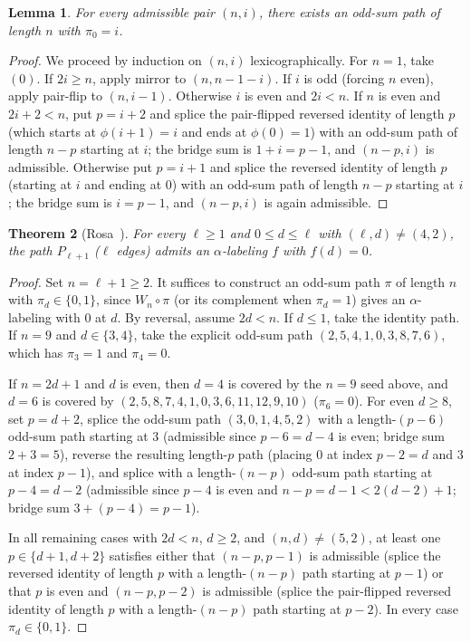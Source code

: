 \documentclass[11pt]{article}
\newtheorem{theorem}{Theorem}[section]
\newtheorem{lemma}[theorem]{Lemma}
\begin{document}
\begin{lemma}\label{lem:block-start}
For every admissible pair $(n, i)$, there exists an odd-sum path of length $n$ with $\pi_0 = i$.
\end{lemma}

\begin{proof}
We proceed by induction on $(n, i)$ lexicographically. For $n = 1$, take $(0)$. If $2i \ge n$, apply mirror to $(n, n - 1 - i)$. If $i$ is odd (forcing $n$ even), apply pair-flip to $(n, i - 1)$. Otherwise $i$ is even and $2i < n$.
If $n$ is even and $2i + 2 < n$, put $p = i + 2$ and splice the pair-flipped reversed identity of length $p$ (which starts at $\phi(i + 1) = i$ and ends at $\phi(0) = 1$) with an odd-sum path of length $n - p$ starting at $i$; the bridge sum is $1 + i = p - 1$, and $(n - p, i)$ is admissible.
Otherwise put $p = i + 1$ and splice the reversed identity of length $p$ (starting at $i$ and ending at $0$) with an odd-sum path of length $n - p$ starting at $i$; the bridge sum is $i = p - 1$, and $(n - p, i)$ is again admissible.
\end{proof}

\begin{theorem}[Rosa~\cite{Rosa1977}]\label{thm:rosa}
For every $\ell \ge 1$ and $0 \le d \le \ell$ with $(\ell, d) \ne (4, 2)$, the path $P_{\ell+1}$ ($\ell$ edges) admits an $\alpha$-labeling $f$ with $f(d) = 0$.
\end{theorem}

\begin{proof}
Set $n = \ell + 1 \ge 2$. It suffices to construct an odd-sum path $\pi$ of length $n$ with $\pi_d \in \{0, 1\}$, since $W_n \circ \pi$ (or its complement when $\pi_d = 1$) gives an $\alpha$-labeling with $0$ at $d$. By reversal, assume $2d < n$. If $d \le 1$, take the identity path. If $n = 9$ and $d \in \{3, 4\}$, take the explicit odd-sum path $(2, 5, 4, 1, 0, 3, 8, 7, 6)$, which has $\pi_3 = 1$ and $\pi_4 = 0$.

If $n = 2d + 1$ and $d$ is even, then $d = 4$ is covered by the $n = 9$ seed above, and $d = 6$ is covered by $(2, 5, 8, 7, 4, 1, 0, 3, 6, 11, 12, 9, 10)$ ($\pi_6 = 0$). For even $d \ge 8$, set $p = d + 2$, splice the odd-sum path $(3, 0, 1, 4, 5, 2)$ with a length-$(p - 6)$ odd-sum path starting at $3$ (admissible since $p - 6 = d - 4$ is even; bridge sum $2 + 3 = 5$), reverse the resulting length-$p$ path (placing $0$ at index $p - 2 = d$ and $3$ at index $p - 1$), and splice with a length-$(n - p)$ odd-sum path starting at $p - 4 = d - 2$ (admissible since $p - 4$ is even and $n - p = d - 1 < 2(d - 2) + 1$; bridge sum $3 + (p - 4) = p - 1$).

In all remaining cases with $2d < n$, $d \ge 2$, and $(n, d) \ne (5, 2)$, at least one $p \in \{d + 1, d + 2\}$ satisfies either that $(n - p, p - 1)$ is admissible (splice the reversed identity of length $p$ with a length-$(n - p)$ path starting at $p - 1$) or that $p$ is even and $(n - p, p - 2)$ is admissible (splice the pair-flipped reversed identity of length $p$ with a length-$(n - p)$ path starting at $p - 2$). In every case $\pi_d \in \{0, 1\}$.
\end{proof}
\end{document}
